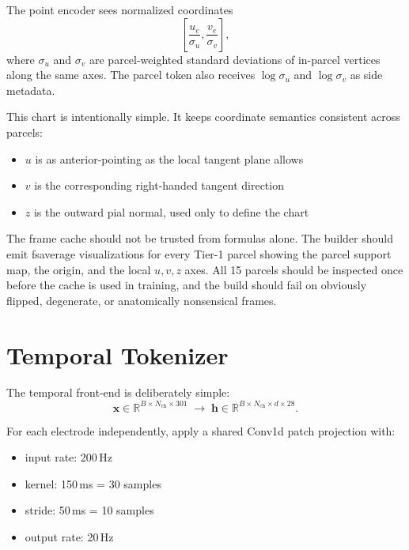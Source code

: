 \documentclass[11pt,letterpaper]{article}
\newcommand{\R}{\mathbb{R}}
\newcommand{\bx}{\mathbf{x}}
\newcommand{\bh}{\mathbf{h}}
\begin{document}
The point encoder sees normalized coordinates
\begin{equation}
\left[\frac{u_e}{\sigma_u}, \frac{v_e}{\sigma_v}\right],
\end{equation}
where $\sigma_u$ and $\sigma_v$ are parcel-weighted standard deviations of in-parcel vertices along the same axes. The parcel token also receives \(\log \sigma_u\) and \(\log \sigma_v\) as side metadata.

This chart is intentionally simple. It keeps coordinate semantics consistent across parcels:
\begin{itemize}[leftmargin=2em, itemsep=0.2em]
\item $u$ is as anterior-pointing as the local tangent plane allows
\item $v$ is the corresponding right-handed tangent direction
\item $z$ is the outward pial normal, used only to define the chart
\end{itemize}

The frame cache should not be trusted from formulas alone. The builder should emit fsaverage visualizations for every Tier-1 parcel showing the parcel support map, the origin, and the local \(u,v,z\) axes. All 15 parcels should be inspected once before the cache is used in training, and the build should fail on obviously flipped, degenerate, or anatomically nonsensical frames.


\section{Temporal Tokenizer}

The temporal front-end is deliberately simple:
\begin{equation}
\bx \in \R^{B \times N_{\text{ch}} \times 301}
\;\rightarrow\;
\bh \in \R^{B \times N_{\text{ch}} \times d \times 28}.
\end{equation}

For each electrode independently, apply a shared Conv1d patch projection with:
\begin{itemize}[leftmargin=2em, itemsep=0.2em]
\item input rate: 200\,Hz
\item kernel: 150\,ms = 30 samples
\item stride: 50\,ms = 10 samples
\item output rate: 20\,Hz
\end{itemize}
\end{document}
